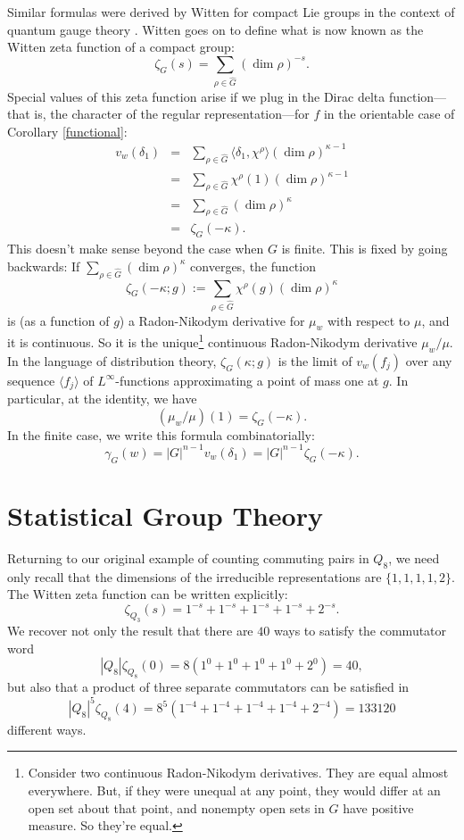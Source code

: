 \documentclass[12pt]{article}
\newcommand{\be}{\begin{equation}}
\newcommand{\ee}{\end{equation}}
\newcommand{\bea}{\begin{eqnarray}}
\newcommand{\eea}{\end{eqnarray}}
\newcommand{\nn}{\nonumber}
\begin{document}
Similar formulas were derived by Witten for compact Lie groups in the context of quantum gauge theory \cite{witten}.  Witten goes on to define what is now known as the Witten zeta function of a compact group:
\be \zeta_{G}(s) = \sum_{\rho \in \hat{G}} (\dim \rho)^{-s}. \ee
Special values of this zeta function arise if we plug in the Dirac delta function---that is, the character of the regular representation---for $f$ in the orientable case of Corollary \ref{functional}:
\bea 
v_w(\delta_1) &=& \sum_{\rho \in \hat{G}} \langle \delta_1, \chi^\rho \rangle (\dim \rho)^{\kappa - 1}\nn\\
              &=& \sum_{\rho \in \hat{G}} \chi^\rho(1) (\dim \rho)^{\kappa - 1}\nn\\
              &=& \sum_{\rho \in \hat{G}} (\dim \rho)^{\kappa}\nn\\
              &=& \zeta_G(-\kappa).
\eea
This doesn't make sense beyond the case when $G$ is finite.  
This is fixed by going backwards: If $\sum_{\rho \in \hat{G}} (\dim \rho)^\kappa$ converges, the function
\be 
\zeta_G(-\kappa; g) := \sum_{\rho \in \hat{G}} \chi^\rho(g) (\dim \rho)^\kappa
\ee
is (as a function of $g$) a Radon-Nikodym derivative for $\mu_w$ with respect to $\mu$, and it is continuous.  So it is the unique\footnote{Consider two continuous Radon-Nikodym derivatives.  They are equal almost everywhere.  But, if they were unequal at any point, they would differ at an open set about that point, and nonempty open sets in $G$ have positive measure.  So they're equal.} continuous Radon-Nikodym derivative $\mu_w/\mu$.  In the language of distribution theory, $\zeta_G(\kappa; g)$ is the limit of $v_w(f_j)$ over any sequence $\langle f_j \rangle$ of $L^\infty$-functions approximating a point of mass one at $g$.  In particular, at the identity, we have
\be 
(\mu_w/\mu)(1) = \zeta_G(-\kappa).
\ee
In the finite case, we write this formula combinatorially:
\be\label{combinatron}
\gamma_G(w) = |G|^{n-1} v_w(\delta_1) = |G|^{n-1} \zeta_G(-\kappa).
\ee

\section{Statistical Group Theory}
Returning to our original example of counting commuting pairs in $Q_8$, we need only recall that the dimensions of the irreducible representations are $\{1, 1, 1, 1, 2\}$.  The Witten zeta function can be written explicitly:
\be \zeta_{Q_3}(s) = 1^{-s} + 1^{-s} + 1^{-s} + 1^{-s} + 2^{-s}. \ee
We recover not only the result that there are $40$ ways to satisfy the commutator word
\be |Q_8| \zeta_{Q_8}(0) = 8(1^0 + 1^0 + 1^0 + 1^0 + 2^{0}) = 40, \ee
but also that a product of three separate commutators can be satisfied in
\be |Q_8|^5 \zeta_{Q_8}(4) = 8^5(1^{-4} +  1^{-4} + 1^{-4} + 1^{-4} + 2^{-4}) = 133120 \ee
different ways.  %
\end{document}
